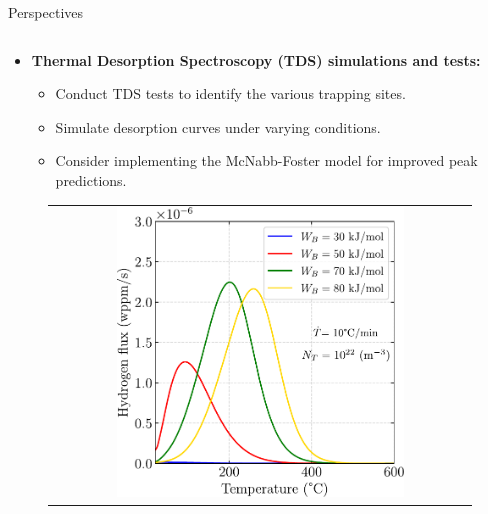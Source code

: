 \documentclass[9pt]{beamer}
\begin{document}
\begin{frame}{Perspectives}

    \begin{columns}

        \begin{column}{0.5\textwidth}
			\begin{itemize}
				\item \textbf{Thermal Desorption Spectroscopy (TDS) simulations and tests:} 
				\vspace{0.15cm}
				\begin{itemize}
					\item Conduct TDS tests to identify the various trapping sites.
					\vspace{0.15cm}
					\item Simulate desorption curves under varying conditions. 
					\vspace{0.15cm}
					\item Consider implementing the McNabb-Foster model for improved peak predictions.
				\end{itemize}
			\end{itemize}
			
			\begin{figure}
        		\begin{tabular}{c}
            		\includegraphics[width=0.7\textwidth]{Images/plot_TDS_WB.pdf} \\
        		\end{tabular}
    		\end{figure}
    		
    	\end{column}
    		

\end{columns}
\end{frame}
\end{document}
